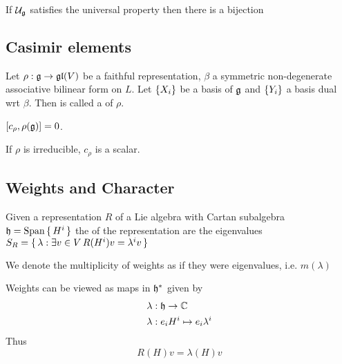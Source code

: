 \documentclass{article}
\begin{document}
\begin{prop}
	If $\mc{U}_\mf{g}$ satisfies the universal property then there is a bijection 
\end{prop}

\subsection{Casimir elements}

\begin{definition}
	Let $\rho:\mf{g} \to \mf{gl}(V)$ be a faithful representation, $\beta$ a symmetric non-degenerate associative bilinear form on $L$. Let $\pbrace{X_i}$ be a basis of $\mf{g}$ and $\pbrace{Y_i}$ a basis dual wrt $\beta$. Then 
is called a  of $\rho$. 
\end{definition}

\begin{prop}
	$\comm[c_\rho]{\rho(\mf{g})}=0$. 
\end{prop}

\begin{corollary}
	If $\rho$ is irreducible, $c_\rho$ is a scalar.
\end{corollary}

\subsection{Weights and Character}
\begin{definition}[Weights]
	Given a representation $R$ of a Lie algebra with Cartan subalgebra $\mf{h}=\spn\set{ H^i }$ the  of the representation are the eigenvalues $S_R=\set{ \lambda : \exists v\in V \, R(H^i)v=\lambda^i v}$
\end{definition}

\begin{notation}
	We denote the multiplicity of weights as if they were eigenvalues, i.e. $m(\lambda)$
\end{notation}

\begin{fact}
	Weights can be viewed as maps in $\mf{h}^\ast$ given by 
	\begin{align*}
		\lambda &:\mf{h}\to\mbb{C} \\
		\lambda &: e_i H^i \mapsto e_i \lambda^i
	\end{align*}
	Thus 
	\[
	R(H)v=\lambda(H)v
	\]
\end{fact}
\end{document}
